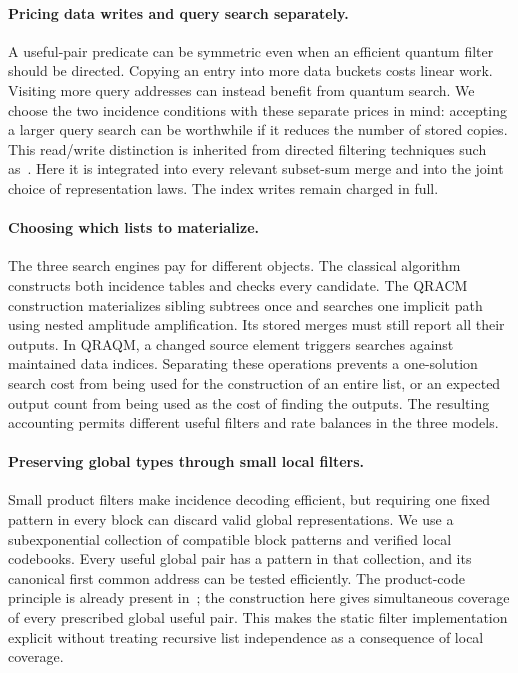 \documentclass[10pt,a4paper]{article}
\theoremstyle{definition}
\begin{document}
\paragraph{Pricing data writes and query search separately.}
A useful-pair predicate can be symmetric even when an efficient quantum
filter should be directed. Copying an entry into more data buckets costs
linear work. Visiting more query addresses can instead benefit from
quantum search. We choose the two incidence conditions with these
separate prices in mind: accepting a larger query search can be worthwhile
if it reduces the number of stored copies. This read/write distinction
is inherited from directed filtering techniques such as~\cite{HKKL}.
Here it is integrated into every relevant subset-sum merge and into the
joint choice of representation laws. The index writes remain charged
in full.

\paragraph{Choosing which lists to materialize.}
The three search engines pay for different objects. The classical
algorithm constructs both incidence tables and checks every candidate.
The QRACM construction materializes sibling subtrees once and searches
one implicit path using nested amplitude amplification. Its stored merges
must still report all their outputs. In QRAQM, a changed source element
triggers searches against maintained data indices. Separating these
operations prevents a one-solution search cost from being used for the
construction of an entire list, or an expected output count from being
used as the cost of finding the outputs. The resulting accounting permits
different useful filters and rate balances in the three models.

\paragraph{Preserving global types through small local filters.}
Small product filters make incidence decoding efficient, but requiring
one fixed pattern in every block can discard valid global
representations. We use a subexponential collection of compatible block
patterns and verified local codebooks. Every useful global pair has a
pattern in that collection, and its canonical first common address can
be tested efficiently. The product-code principle is already present
in~\cite[Proposition~5]{HG26}; the construction here gives simultaneous
coverage of every prescribed global useful pair. This makes the static
filter implementation explicit without treating recursive list
independence as a consequence of local coverage.
\end{document}
